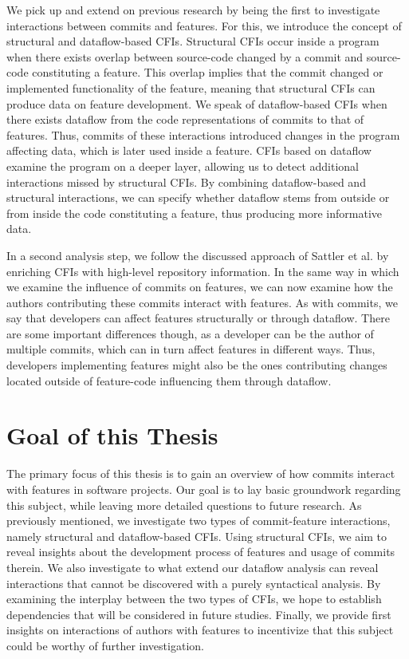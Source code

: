 We pick up and extend on previous research by being the first to investigate interactions between commits and features.
For this, we introduce the concept of structural and dataflow-based CFIs.
Structural CFIs occur inside a program when there exists overlap between source-code changed by a commit and source-code constituting a feature.
This overlap implies that the commit changed or implemented functionality of the feature, meaning that structural CFIs can produce data on feature development.
We speak of dataflow-based CFIs when there exists dataflow from the code representations of commits to that of features.
Thus, commits of these interactions introduced changes in the program affecting data, which is later used inside a feature.
CFIs based on dataflow examine the program on a deeper layer, allowing us to detect additional interactions missed by structural CFIs.
By combining dataflow-based and structural interactions, we can specify whether dataflow stems from outside or from inside the code constituting a feature, thus producing more informative data.

In a second analysis step, we follow the discussed approach of Sattler et al. by enriching CFIs with high-level repository information.
In the same way in which we examine the influence of commits on features, we can now examine how the authors contributing these commits interact with features.
As with commits, we say that developers can affect features structurally or through dataflow.
There are some important differences though, as a developer can be the author of multiple commits, which can in turn affect features in different ways.
Thus, developers implementing features might also be the ones contributing changes located outside of feature-code influencing them through dataflow.

\section{Goal of this Thesis}

The primary focus of this thesis is to gain an overview of how commits interact with features in software projects. 
Our goal is to lay basic groundwork regarding this subject, while leaving more detailed questions to future research. 
As previously mentioned, we investigate two types of commit-feature interactions, namely structural and dataflow-based CFIs. 
Using structural CFIs, we aim to reveal insights about the development process of features and usage of commits therein. 
We also investigate to what extend our dataflow analysis can reveal interactions that cannot be discovered with a purely syntactical analysis.
By examining the interplay between the two types of CFIs, we hope to establish dependencies that will be considered in future studies.
Finally, we provide first insights on interactions of authors with features to incentivize that this subject could be worthy of further investigation.

